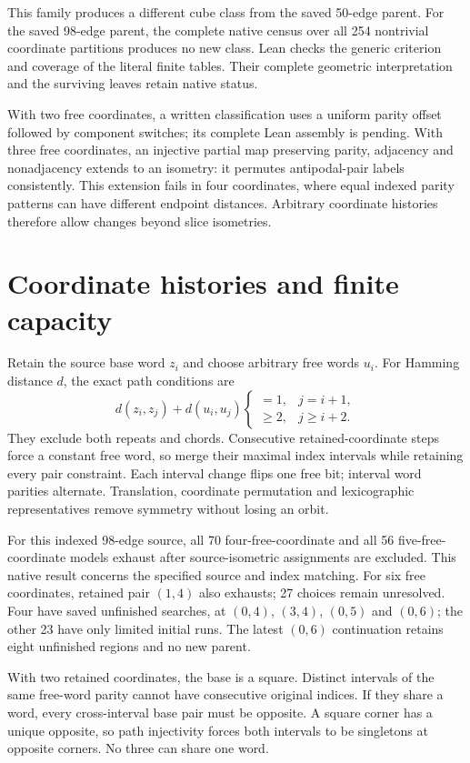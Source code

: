\documentclass[11pt,a4paper]{article}
\begin{document}
This family produces a different cube class from the saved 50-edge parent.
For the saved 98-edge parent, the complete native census over all 254
nontrivial coordinate partitions produces no new class. Lean checks the
generic criterion and coverage of the literal finite tables. Their complete
geometric interpretation and the surviving leaves retain native status.

With two free coordinates, a written classification uses a uniform parity
offset followed by component switches; its complete Lean assembly is pending.
With three free coordinates, an injective partial map preserving parity,
adjacency and nonadjacency extends to an isometry: it permutes antipodal-pair
labels consistently. This extension fails in four coordinates, where equal
indexed parity patterns can have different endpoint distances. Arbitrary
coordinate histories therefore allow changes beyond slice isometries.

\section{Coordinate histories and finite capacity}
Retain the source base word $z_i$ and choose arbitrary free words $u_i$.
For Hamming distance $d$, the exact path conditions are
\[
d(z_i,z_j)+d(u_i,u_j)
\begin{cases}=1,&j=i+1,\\ \ge2,&j\ge i+2.\end{cases}
\]
They exclude both repeats and chords. Consecutive retained-coordinate steps
force a constant free word, so merge their maximal index intervals while
retaining every pair constraint. Each interval change flips one free bit;
interval word parities alternate. Translation, coordinate permutation and
lexicographic representatives remove symmetry without losing an orbit.

For this indexed 98-edge source, all 70 four-free-coordinate and all 56
five-free-coordinate models exhaust after source-isometric assignments are
excluded. This native result concerns the specified source and index matching.
For six free coordinates, retained pair $(1,4)$ also exhausts; 27 choices
remain unresolved. Four have saved unfinished searches, at $(0,4)$,
$(3,4)$, $(0,5)$ and $(0,6)$; the other 23 have only limited initial runs.
The latest $(0,6)$ continuation retains eight unfinished regions and no new parent.

With two retained coordinates, the base is a square. Distinct intervals of
the same free-word parity cannot have consecutive original indices.
If they share a word, every cross-interval base pair must be opposite.
A square corner has a unique opposite, so path injectivity forces both
intervals to be singletons at opposite corners. No three can share one word.
\end{document}
